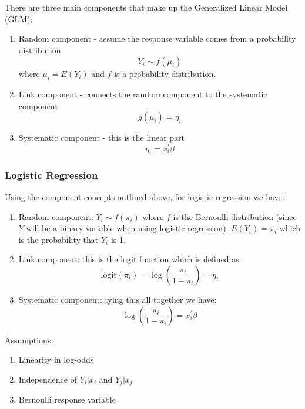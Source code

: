 \documentclass[paper=a4, fontsize=11pt]{scrartcl} %
\numberwithin{equation}{section} %
\numberwithin{figure}{section} %
\numberwithin{table}{section} %
\begin{document}
There are three main components that make up the Generalized Linear Model (GLM):

\begin{enumerate}
\item Random component - assume the response variable comes from a probability distribution
\begin{equation}
Y_i \sim f(\mu_i)
\end{equation}
where $\mu_i = E(Y_i)$ and $f$ is a probability distribution.
\item Link component - connects the random component to the systematic component
\begin{equation}
g(\mu_i)=\eta_i
\end{equation}
\item Systematic component - this is the linear part
\begin{equation}
\eta_i = x_i^\prime \beta
\end{equation}

\end{enumerate}


\subsubsection{Logistic Regression}

Using the component concepts outlined above, for logistic regression we have:

\begin{enumerate}
\item Random component: $Y_i \sim f(\pi_i)$ where $f$ is the Bernoulli distribution (since $Y$ will be a binary variable when using logistic regression). $E(Y_i) = \pi_i $ which is the probability that $Y_i$ is 1.
\item Link component: this is the logit function which is defined as:
\begin{equation}
\text{logit}(\pi_i) = \log \left(\frac{\pi_i}{1-\pi_i} \right) = \eta_i
\end{equation}
\item Systematic component: tying this all together we have:
\begin{equation}
\log \left(\frac{\pi_i}{1-\pi_i}\right) = x_i^\prime \beta
\end{equation}
\end{enumerate}

Assumptions:
\begin{enumerate}
\item Linearity in log-odds
\item Independence of $Y_i|x_i$ and $Y_j|x_j$
\item Bernoulli response variable
\end{enumerate}
\end{document}
